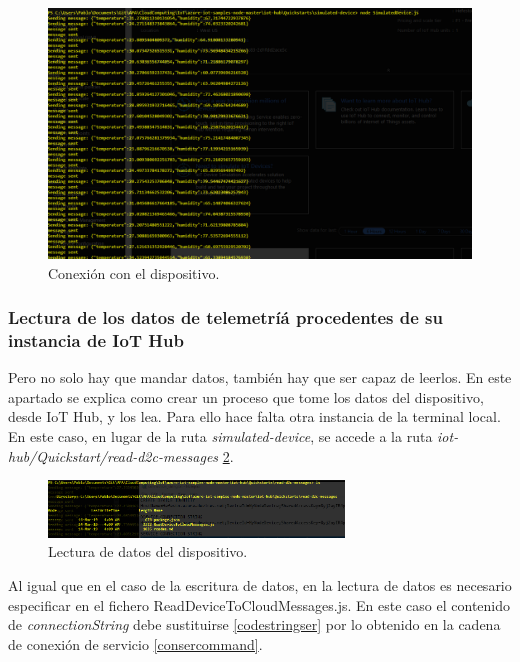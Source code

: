\documentclass[english,runningheads,a4paper]{llncs}[2018/03/10]
\begin{document}
\begin{figure}[h!]
 \centering
 \includegraphics[width=\textwidth]{./IoT/MicrosoftAzure/4-5_send_simulated_telemetry.png}
 \caption{Conexión con el dispositivo.}
 \label{nodedev}
\end{figure}

\subsubsection{Lectura de los datos de telemetríá procedentes de su instancia de
IoT Hub}

Pero no solo hay que mandar datos, también hay que ser capaz de leerlos. En este
apartado se explica como crear un proceso que tome los datos del dispositivo,
desde IoT Hub, y los lea. Para ello hace falta otra instancia de la terminal
local. En este caso, en lugar de la ruta \textit{simulated-device}, se accede a
la ruta \textit{iot-hub/Quickstart/read-d2c-messages}
\hyperref[directoryreader]{\ref{directoryreader}}.

\begin{figure}[h!]
 \centering
 \includegraphics[width=0.7\textwidth]{./IoT/MicrosoftAzure/5-1_read_telemetry.png}
 \caption{Lectura de datos del dispositivo.}
 \label{directoryreader}
\end{figure}

Al igual que en el caso de la escritura de datos, en la lectura de datos es
necesario especificar en el fichero ReadDeviceToCloudMessages.js. En este caso
el contenido de \textit{connectionString} debe sustituirse
\hyperref[codestringser]{\ref{codestringser}} por lo obtenido en la cadena de 
conexión de servicio \hyperref[consercommand]{\ref{consercommand}}.
\end{document}
